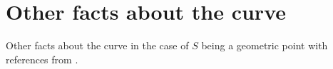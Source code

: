 \documentclass{article}
\begin{document}
\section{Other facts about the curve}

Other facts about the curve 
in the case of $S$ being a geometric point
with references from \cite{FF18}.

\end{document}
